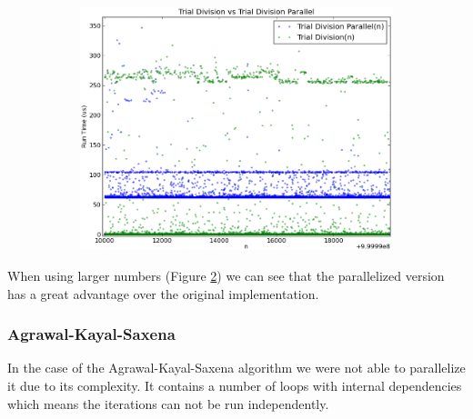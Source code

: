 \documentclass[compressed,final,notitlepage,narroweqnarray,inline,twoside,]{ieee}
\begin{document}
\begin{figure}
        \centering
        \begin{subfigure}[b]{0.515\textwidth}
                \includegraphics[width=\textwidth]{../images/isPrime_par_comparison}
                \label{fig:gull}
        \end{subfigure}
        \vspace{-30pt}\caption{}\label{fig:isprime_p_comparison_large}
\end{figure}
When using larger numbers (Figure \ref{fig:isprime_p_comparison_large}) we can see that the parallelized version has a great advantage over the original implementation. 
\subsubsection{Agrawal-Kayal-Saxena}
In the case of the Agrawal-Kayal-Saxena algorithm we were not able to parallelize it due to its complexity. It contains a number of loops with internal dependencies which means the iterations can not be run independently.
\end{document}
